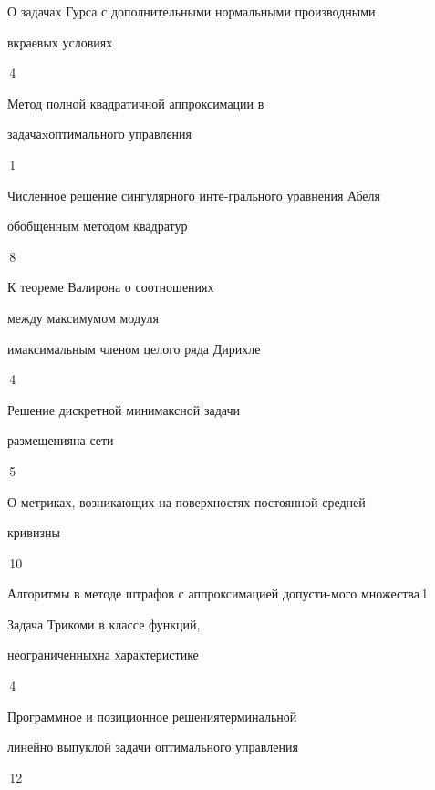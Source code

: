 

{О задачах Гурса с дополнительными нормальными производными 


в\newline краевых условиях}{\No\,4}




{Метод полной квадратичной аппроксимации в


задачаx\newline оптимального управления}{\No\,1}










{Численное решение сингулярного инте-\newline грального уравнения Абеля


обобщенным методом квадратур}{\No\,8}




{К теореме Валирона о соотношениях


между максимумом модуля


и\newline максимальным членом целого ряда Дирихле}{\No\,4}




{Решение дискретной минимаксной задачи


размещения\newline на сети}{\No\,5}




{О метриках, возникающих на поверхностях постоянной средней  


кривизны}{\No\,10}




{Алгоритмы в методе штрафов с аппроксимацией допусти-\newline мого множества}{\No\,1}




{Задача Трикоми в классе функций, 


неограниченных\newline на характеристике}{\No\,4}




{Программное и позиционное решения\newline терминальной


линейно выпуклой задачи оптимального управления}{\No\,12}


